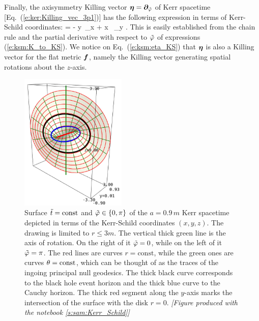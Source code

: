 Finally, the axisymmetry Killing vector $\bm{\eta} = \bm{\partial}_{\tilde\varphi}$
of Kerr spacetime [Eq.~(\ref{e:ker:Killing_vec_3p1})] has the following
expression in terms of Kerr-Schild coordinates:
\be \label{e:ksm:eta_KS}
    \w{\eta} = - y\, \wpar_x + x \, \wpar_y .
\ee
This is easily established from the chain rule and the partial
derivative with respect to ${\tilde\varphi}$ of expressions (\ref{e:ksm:K_to_KS}).
We notice on Eq.~(\ref{e:ksm:eta_KS}) that $\bm{\eta}$ is also a Killing vector for the flat metric $\bm{f}$,
namely the Killing vector generating spatial rotations about the $z$-axis.

\begin{figure}
\centerline{\includegraphics[width=0.45\textwidth]{ksm_phi_cut.jpg}}
\caption[]{\label{f:ksm:phi_cut} \footnotesize
Surface ${\tilde t}=\mathrm{const}$ and ${\tilde\varphi}\in\{0,\pi\}$ of the $a=0.9\, m$
Kerr spacetime
depicted in terms of
the Kerr-Schild coordinates $(x,y,z)$.
The drawing is limited to $r\leq 3 m$.
The vertical thick green line is
the axis of rotation. On the right of it ${\tilde\varphi}=0$, while on the left
of it ${\tilde\varphi}=\pi$.
The red lines are curves $r=\mathrm{const}$,
while the green ones are curves $\theta=\mathrm{const}$, which can be thought of as
the traces of the ingoing principal null geodesics.
The thick black curve corresponds
to the black hole event horizon and the thick blue curve to the Cauchy horizon.
The thick red segment along the $y$-axis
marks the intersection of the surface with the disk $r=0$.
\textsl{[Figure produced with the notebook \ref{s:sam:Kerr_Schild}]}
}
\end{figure}




